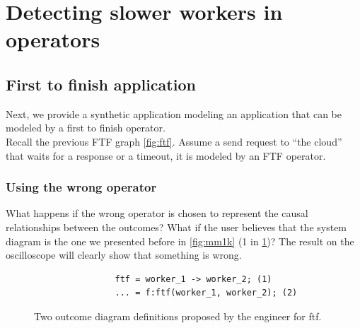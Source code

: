 \section{Detecting slower workers in operators}
    \subsection{First to finish application}
        Next, we provide a synthetic application modeling an application that can be modeled by a first to finish operator. \\
        Recall the previous FTF graph \cref{fig:ftf}. Assume a send request to ``the cloud'' that waits for a response or a timeout, it is modeled by an FTF operator. \cite{dq-tut}
       \subsubsection{Using the wrong operator}
            What happens if the wrong operator is chosen to represent the causal relationships between the outcomes? What if the user believes that the system diagram is the one we presented before in \cref{fig:mm1k} (1 in \cref{code:wrong_od})? The result on the oscilloscope will clearly show that something is wrong.
            \begin{figure}[H]
            \begin{verbatim}
                ftf = worker_1 -> worker_2; (1)
                ... = f:ftf(worker_1, worker_2); (2)
            \end{verbatim}
            \caption{Two outcome diagram definitions proposed by the engineer for ftf.}
                \label{code:wrong_od}
            \end{figure}

